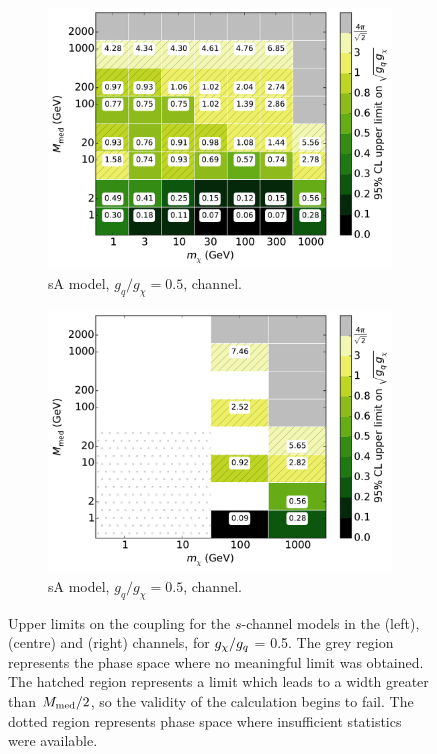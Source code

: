 \begin{figure}
\begin{subfigure}[t]{0.32\textwidth}
    \includegraphics[width=1.\textwidth]{figures/grid_allpoints_SAD_rat05.pdf}
    \caption{sA model, $g_q/g_{\chi} = 0.5$, \monoZ channel.}
  \end{subfigure}
  \begin{subfigure}[t]{0.32\textwidth}
    \centering
    \includegraphics[width=1.\textwidth]{figures/grid_basepoints_SAD_rat05_monoWZ.pdf}
    \caption{sA model, $g_q/g_{\chi} = 0.5$, \monoWZ channel.}
  \end{subfigure}
  \caption{Upper limits on the coupling for the $s$-channel models in the \monojet (left), \monoZ (centre) and \monoWZ (right) channels, for $g_{\chi} / g_q$ = 0.5. The grey region represents the phase space where no meaningful limit was obtained. The hatched region represents a limit which leads to a width greater than $M_{\mathrm{med}} / 2$, so the validity of the calculation begins to fail. The dotted region represents phase space where insufficient statistics were available.}
  \label{fig:results_sVsA_rat05}
\end{figure}

